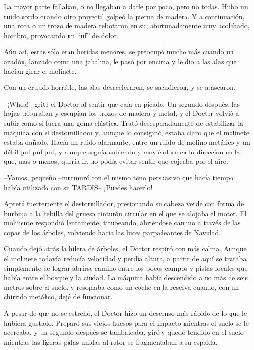 La mayor parte fallaban, o no llegaban a darle por poco, pero no todas. Hubo un ruido sordo cuando otro proyectil golpeó la pierna de madera. Y a continuación, una roca o un trozo de madera rebotaron en su, afortunadamente muy acolchado, hombro, provocando un ``uf'' de dolor.

Aún así, estas sólo eran heridas menores, se preocupó mucho más cuando un azadón, lanzado como una jabalina, le pasó por encima y le dio a las alas que hacían girar el molinete.

Con un crujido horrible, las alas desaceleraron, se sacudieron, y se atascaron. 

--¡Whoa! --gritó el Doctor al sentir que caía en picado. Un segundo después, las hojas trituraban y escupían los trozos de madera y metal, y el Doctor volvió a subir como si fuera una goma elástica. Trató desesperadamente de estabilizar la máquina con el destornillador y, aunque lo consiguió, estaba claro que el molinete estaba dañado. Hacía un ruido alarmante, entre un ruido de molino metálico y un débil puf-puf-puf, y aunque seguía subiendo y moviéndose en la dirección en la que, más o menos, quería ir, no podía evitar sentir que cojeaba por el aire.

--Vamos, pequeño --murmuró con el mismo tono persuasivo que hacía tiempo había utilizado con su TARDIS-- ¡Puedes hacerlo!

Apretó fuertemente el destornillador, presionando su cabeza verde con forma de burbuja a la hebilla del grueso cinturón circular en el que se alojaba el motor. El molinente respondió lentamente, titubeando, abriéndose camino a través de las copas de los árboles, volviendo hacia las luces parpadeantes de Navidad.

Cuando dejó atrás la hilera de árboles, el Doctor respiró con más calma. Aunque el molinete todavía reducía velocidad y perdía altura, a partir de aquí se trataba simplemente de lograr abrirse camino entre los pocos campos y pistas locales que había entre el bosque y la ciudad. La máquina había descendido a no más de seis metros sobre el suelo, y resoplaba como un coche en la reserva cuando, con un chirrido metálico, dejó de funcionar.

A pesar de que no se estrelló, el Doctor hizo un descenso más rápido de lo que le hubiera gustado. Preparó sus viejos huesos para el impacto mientras el suelo se le acercaba, y un segundo después se tambaleaba, giró y quedó tendido en el suelo mientras las ligeras palas unidas al rotor se fragmentaban a su espalda.

